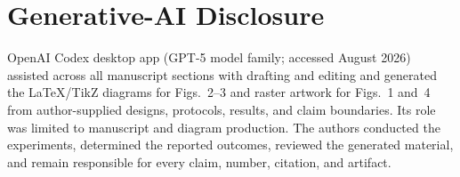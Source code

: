 \section*{Generative-AI Disclosure}
OpenAI Codex desktop app (GPT-5 model family; accessed August 2026) assisted across all manuscript
sections with drafting and editing and generated the LaTeX/TikZ diagrams for
Figs.~2--3 and raster artwork for Figs.~1 and~4 from author-supplied designs,
protocols, results, and claim boundaries.  Its role was limited to manuscript
and diagram production.  The
authors conducted the experiments, determined the reported outcomes, reviewed
the generated material, and remain responsible for every claim, number,
citation, and artifact.
